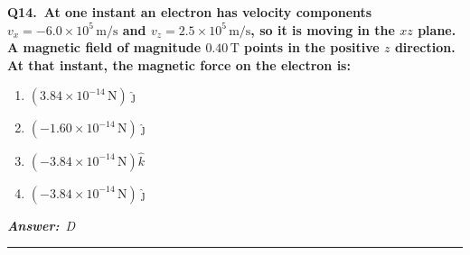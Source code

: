 \documentclass[11pt]{article}
\newcommand{\QuestionStyle}[1]{{\large\bfseries\boldmath #1}}
\newcommand{\AnswerStyle}[1]{{\large\bfseries\boldmath #1}}
\newcommand{\ReasonStyle}[1]{{\normalsize #1}}
\newif\ifshowreason
\newcommand{\Correct}[2]{%
  \item \AnswerStyle{\textcolor{AnsRed}{#1}}%
  \ifshowreason\\[-0.2em]
    \ReasonStyle{\textcolor{AnsRed}{#2}}%
  \fi
}
\newcommand{\Wrong}[2]{%
  \item \AnswerStyle{\textcolor{WrongBlue}{#1}}%
  \ifshowreason\\[-0.2em]
    \ReasonStyle{\textcolor{WrongBlue}{#2}}%
  \fi
}
\newcommand{\QBlock}[4]{%
  \Needspace{8\baselineskip}%
  \noindent
  \begin{minipage}{\linewidth}
    \QuestionStyle{#1.~#2}

    \vspace{0.25em}
    \begin{enumerate}
      #3
    \end{enumerate}

    \vspace{0.1em}
    \noindent\textcolor{AnsRed}{\textit{\textbf{Answer:}~#4}}

    \vspace{0.25em}
    \hrule height 0.4pt
  \end{minipage}
  \vspace{0.75em}
}
\begin{document}
\QBlock{Q14}{At one instant an electron has velocity components $v_x=-6.0\times10^5\,\text{m/s}$ and $v_z=2.5\times10^5\,\text{m/s}$, so it is moving in the $xz$ plane. A magnetic field of magnitude $0.40\,\text{T}$ points in the positive $z$ direction. At that instant, the magnetic force on the electron is:}{%
\Wrong{$(3.84 \times 10^{-14}\,\text{N})\hat{\jmath}$}{This gets the magnitude right but forgets that the particle is negatively charged. The electron's charge reverses the direction of $\vec v\times\vec B$.}
\Wrong{$(-1.60 \times 10^{-14}\,\text{N})\hat{\jmath}$}{This uses an incorrect magnitude, likely by including the wrong velocity component or making an arithmetic error. Only the component perpendicular to $\vec B$ contributes to the magnetic force.}
\Wrong{$(-3.84 \times 10^{-14}\,\text{N})\hat{k}$}{This puts the force along the field direction, which cannot happen for a magnetic force. Since $\vec F=q\vec v\times\vec B$, the force must be perpendicular to both $\vec v$ and $\vec B$.}
\Correct{$(-3.84 \times 10^{-14}\,\text{N})\hat{\jmath}$}{The magnetic force is $\vec F=q\vec v\times\vec B$. With $\vec v=(v_x,0,v_z)$ and $\vec B=(0,0,0.40)$, only $v_x$ contributes, giving $\vec v\times\vec B=(0,-v_xB,0)=(0,2.4\times10^5,0)$; multiplying by $q=-1.60\times10^{-19}\,\text{C}$ gives $\vec F=(-3.84\times10^{-14}\,\text{N})\hat{\jmath}$.}
}{D}
\end{document}
